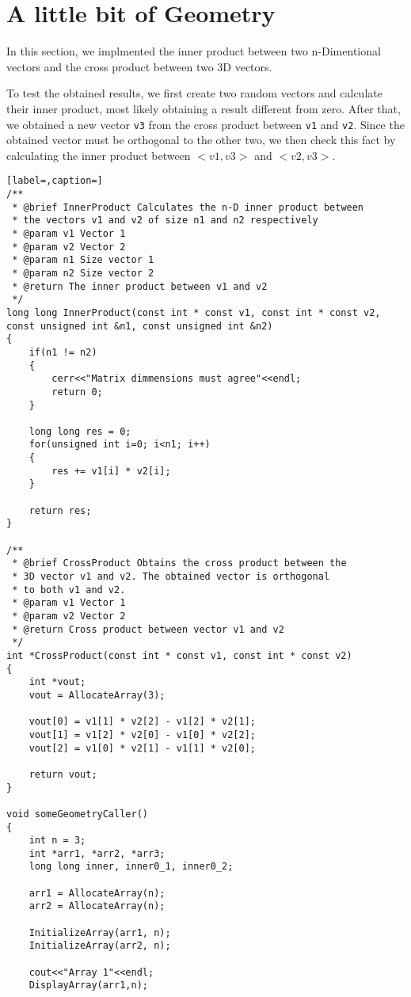\documentclass{article}
\begin{document}
\section{A little bit of Geometry}

In this section, we implmented the inner product between two n-Dimentional
vectors and the cross product between two 3D vectors.

To test the obtained results, we first create two random vectors and calculate
their inner product, most likely obtaining a result different from zero.
After that, we obtained a new vector \verb+v3+ from the cross product between
\verb+v1+ and \verb+v2+. Since the obtained vector must be orthogonal to the other
two, we then check this fact by calculating the inner product between $<v1,v3>$
and $<v2,v3>$. 

\begin{lstlisting}[label=,caption=]
/**
 * @brief InnerProduct Calculates the n-D inner product between
 * the vectors v1 and v2 of size n1 and n2 respectively
 * @param v1 Vector 1
 * @param v2 Vector 2
 * @param n1 Size vector 1
 * @param n2 Size vector 2
 * @return The inner product between v1 and v2
 */
long long InnerProduct(const int * const v1, const int * const v2, const unsigned int &n1, const unsigned int &n2)
{
	if(n1 != n2)
	{
		cerr<<"Matrix dimmensions must agree"<<endl;
		return 0;
	}

	long long res = 0;
	for(unsigned int i=0; i<n1; i++)
	{
		res += v1[i] * v2[i];
	}

	return res;
}

/**
 * @brief CrossProduct Obtains the cross product between the
 * 3D vector v1 and v2. The obtained vector is orthogonal
 * to both v1 and v2.
 * @param v1 Vector 1
 * @param v2 Vector 2
 * @return Cross product between vector v1 and v2
 */
int *CrossProduct(const int * const v1, const int * const v2)
{
	int *vout;
	vout = AllocateArray(3);

	vout[0] = v1[1] * v2[2] - v1[2] * v2[1];
	vout[1] = v1[2] * v2[0] - v1[0] * v2[2];
	vout[2] = v1[0] * v2[1] - v1[1] * v2[0];

	return vout;
}

void someGeometryCaller()
{
	int n = 3;
	int *arr1, *arr2, *arr3;
	long long inner, inner0_1, inner0_2;

	arr1 = AllocateArray(n);
	arr2 = AllocateArray(n);

	InitializeArray(arr1, n);
	InitializeArray(arr2, n);

	cout<<"Array 1"<<endl;
	DisplayArray(arr1,n);


\end{lstlisting}
\end{document}
